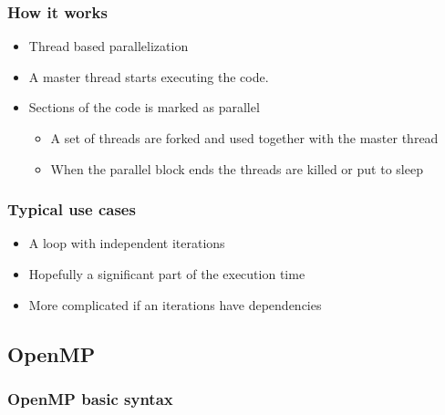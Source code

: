 \subsubsection{How it works}\label{how-it-works}

\begin{itemize}
\itemsep1pt\parskip0pt
\item
  Thread based parallelization
\item
  A master thread starts executing the code.
\item
  Sections of the code is marked as parallel

  \begin{itemize}
  \itemsep1pt\parskip0pt
  \item
    A set of threads are forked and used together with the master thread
  \item
    When the parallel block ends the threads are killed or put to sleep
  \end{itemize}
\end{itemize}

\subsubsection{Typical use cases}\label{typical-use-cases}

\begin{itemize}
\itemsep1pt\parskip0pt
\item
  A loop with independent iterations
\item
  Hopefully a significant part of the execution time
\item
  More complicated if an iterations have dependencies
\end{itemize}

\subsection{OpenMP}\label{openmp-1}

\subsubsection{OpenMP basic syntax}\label{openmp-basic-syntax}

